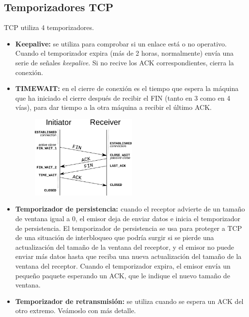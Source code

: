 \begin{onepage}
\subsection{Temporizadores TCP}
TCP utiliza 4 temporizadores.
\begin{itemize}
    \item \textbf{Keepalive: }se utiliza para comprobar si un enlace está o no operativo. Cuando el temporizador expira (más de 2 horas, normalmente) envía una serie de señales \textit{keepalive}. Si no recive los ACK correspondientes, cierra la conexión.
    \item \textbf{TIMEWAIT: }en el cierre de conexión es el tiempo que espera la máquina que ha iniciado el cierre después de recibir el FIN (tanto en 3 como en 4 vías), para dar tiempo a la otra máquina a recibir el último ACK.
    \begin{figure}[H] \centering
    \includegraphics[width=0.5\textwidth]{img/TCP_TIMEWAIT.png}\end{figure}
    \item \textbf{Temporizador de persistencia: \label{tempers}}cuando el receptor advierte de un tamaño de ventana igual a 0, el emisor deja de enviar datos e inicia el temporizador de persistencia. El temporizador de persistencia se usa para proteger a TCP de una situación de interbloqueo que podría surgir si se pierde una actualización del tamaño de la ventana del receptor, y el emisor no puede enviar más datos hasta que reciba una nueva actualización del tamaño de la ventana del receptor. Cuando el temporizador expira, el emisor envía un pequeño paquete esperando un ACK, que le indique el nuevo tamaño de ventana.
    \item \textbf{Temporizador de retransmisión: }se utiliza cuando se espera un ACK del otro extremo. Veámoslo con más detalle.
\end{itemize}
\end{onepage}

